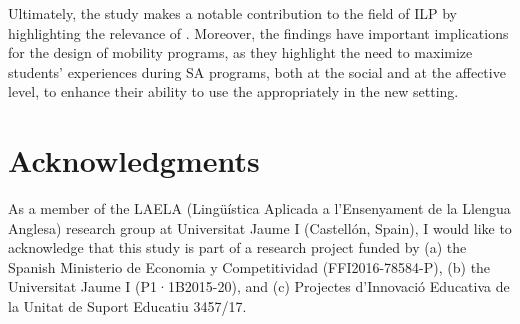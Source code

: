 \documentclass[output=paper]{langsci/langscibook}
\begin{document}
Ultimately, the study makes a notable contribution to the field of ILP by highlighting the relevance of . Moreover, the findings have important implications for the design of mobility programs, as they highlight the need to maximize students’  experiences during SA programs, both at the social and at the affective level, to enhance their ability to use the  appropriately in the new  setting. 

\section*{Acknowledgments}

As a member of the LAELA (Lingüística Aplicada a l’Ensenyament de la
Llengua Anglesa) research group at Universitat Jaume I (Castellón, Spain),
I would like to acknowledge that this study is part of a research project
funded by (a) the Spanish Ministerio de Economia y Competitividad
(FFI2016-78584-P), (b) the Universitat Jaume I (P1·1B2015-20), and (c)
Projectes d’Innovació Educativa de la Unitat de Suport Educatiu 3457/17.


\sloppy
\printbibliography[heading=subbibliography,notkeyword=this] 
\end{document}

